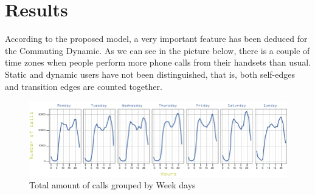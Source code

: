 \newpage
\section{Results}

According to the proposed model, a very important feature has been deduced for the Commuting Dynamic. As we can see in the picture below, there is a couple of time zones when people perform more phone calls from their handsets than usual. Static and dynamic users have not been distinguished, that is, both self-edges and transition edges are counted together.

\begin{figure}[h]
\begin{center}
\includegraphics[scale =1.1] {results/images/calls_number.pdf}
\caption{Total amount of calls grouped by Week days}
\label{fig:count_calls}
\end{center}
\end{figure}



